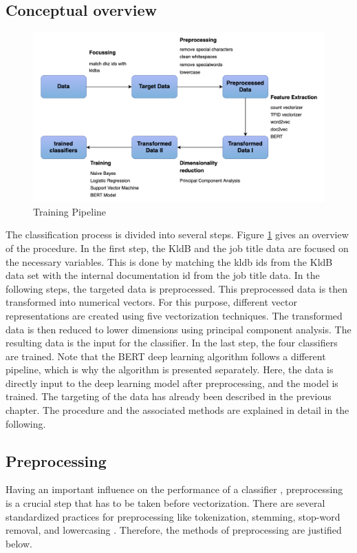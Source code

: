 \documentclass[12pt, a4paper, titlepage]{article}
\begin{document}
\subsection{Conceptual overview}

\begin{figure}[]
  \center
  \includegraphics[scale=0.5]{pipeline_MA.png}
  \caption{\label{fig: F8} Training Pipeline}
\end{figure}

The classification process is divided into several steps. Figure \ref{fig: F8} gives an overview of the procedure. In the first step, the \ac{KldB} and the job title data are focused on the necessary variables. This is done by matching the kldb ids from the \ac{KldB} data set with the internal documentation id from the job title data. In the following steps, the targeted data is preprocessed. This preprocessed data is then transformed into numerical vectors. For this purpose, different vector representations are created using five vectorization techniques. The transformed data is then reduced to lower dimensions using principal component analysis. The resulting data is the input for the classifier. In the last step, the four classifiers are trained. Note that the \ac{BERT} deep learning algorithm follows a different pipeline, which is why the algorithm is presented separately. Here, the data is directly input to the deep learning model after preprocessing, and the model is trained. The targeting of the data has already been described in the previous chapter. The procedure and the associated methods are explained in detail in the following.

\subsection{Preprocessing}
Having an important influence on the performance of a classifier \citep{uysal2014, hacohen2020, gonccalves2005}, preprocessing is a crucial step that has to be taken before vectorization. There are several standardized practices for preprocessing like tokenization, stemming, stop-word removal, and lowercasing \citep{alsmadi2019}. Therefore, the methods of preprocessing are justified below.
\end{document}
